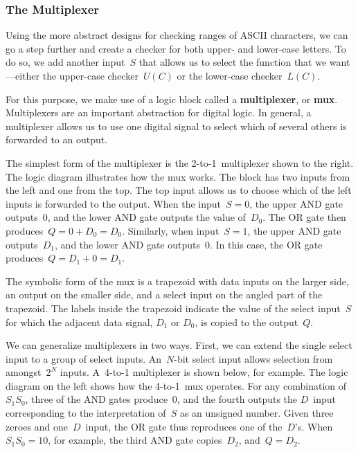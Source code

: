 \pagebreak

\subsubsection{The Multiplexer}

Using the more abstract designs for checking ranges of ASCII characters,
we can go a step further and create a checker for both upper- and lower-case
letters.  To do so, we add another input~$S$ that allows us to select the 
function that we want---either the upper-case checker~$U(C)$ or the 
lower-case checker~$L(C)$.

For this purpose, we make use of a logic block called a {\bf multiplexer},
or {\bf mux}.
Multiplexers are an important abstraction for digital logic.  In 
general, a multiplexer allows us to use one digital signal to 
select which of several others is forwarded to an output.

\begin{minipage}{3.4in}
The simplest form of the multiplexer is the 2-to-1~multiplexer shown to 
the right.   The logic diagram illustrates how the mux works.  The block 
has two inputs from the left and one from the top.  The top input allows 
us to choose which of the left inputs is forwarded to the output.  
When the input~$S=0$, the upper AND gate outputs~0, and the lower AND gate
outputs the value of~$D_0$.  The OR gate then produces~$Q=0+D_0=D_0$.
Similarly, when input~$S=1$, the upper AND gate outputs~$D_1$, and the
lower AND gate outputs~0.  In this case, the OR gate produces~$Q=D_1+0=D_1$.
\end{minipage}\hspace{.25in}%
\begin{minipage}{2.85in}
\vspace{12pt}
\end{minipage}

The symbolic form of the mux is a trapezoid with data inputs on the 
larger side, an output on the smaller side, and a select input on the
angled part of the trapezoid.  The labels inside the trapezoid indicate 
the value of the select input~$S$ for which the adjacent data signal, 
$D_1$ or $D_0$, is copied to the output~$Q$.

We can generalize multiplexers in two ways.  First, we can extend the 
single select input to a group of select inputs.  An~\mbox{$N$-bit}
select input allows selection from amongst~$2^N$ inputs.  A~\mbox{4-to-1} 
multiplexer is shown below, for example.  The logic diagram on the left
shows how the \mbox{4-to-1~mux} operates.  For any combination of $S_1S_0$,
three of the AND gates produce~0, and the fourth outputs the $D$~input
corresponding to the interpretation of~$S$ as an unsigned number.
Given three zeroes and one~$D$~input, the OR gate thus reproduces one of 
the~$D$'s.  When $S_1S_0=10$, for example, the third AND gate copies~$D_2$,
and~$Q=D_2$.\\

